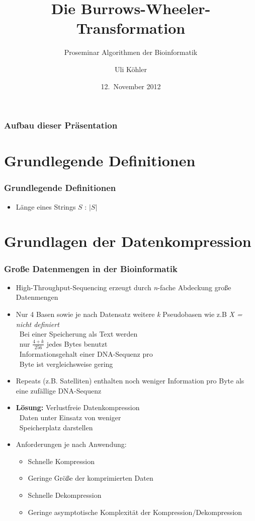 \documentclass[14pt,xcolor=dvipsnames,pdftex]{beamer}
\title{Die Burrows-Wheeler-Transformation}
\subtitle{Proseminar \glqq Algorithmen der Bioinformatik\grqq}
\author{Uli Köhler}
\date{12.~November 2012}
\begin{document}
\frame{\titlepage}
\begin{frame}
\frametitle{Aufbau dieser Präsentation}
\tableofcontents
\end{frame}
\section{Grundlegende Definitionen}
\begin{frame}
 \frametitle{Grundlegende Definitionen}
 \begin{itemize}
  \item Länge eines Strings $S$ : $|S|$
 \end{itemize}

\end{frame}

\section{Grundlagen der Datenkompression}
\begin{frame}[allowframebreaks]
\frametitle{Große Datenmengen in der Bioinformatik}
  \begin{itemize}
   \item High-Throughput-Sequencing erzeugt durch \textit{n}-fache Abdeckung große Datenmengen
   \item Nur 4 Basen  sowie je nach Datensatz weitere \textit{k} Pseudobasen wie z.B \textit{X = nicht definiert}\\
   \textrightarrow\ Bei einer Speicherung als Text werden\\\quad\ nur $\frac{4+k}{256}$ jedes Bytes benutzt\\
   \textrightarrow\ Informationsgehalt einer DNA-Sequenz pro\\\quad\ Byte ist vergleichsweise gering
  \end{itemize}
\framebreak
\begin{itemize}
 \item Repeats (z.B. Satelliten) enthalten noch weniger Information pro Byte als eine zufällige DNA-Sequenz
\end{itemize}
\framebreak
\begin{itemize}
 \item \textbf{Lösung:} Verlustfreie Datenkompression\\
 \textrightarrow\ Daten unter Einsatz von weniger\\
 \quad\ Speicherplatz darstellen
 \item Anforderungen je nach Anwendung:
 \begin{itemize}
  \item Schnelle Kompression
  \item Geringe Größe der komprimierten Daten
  \item Schnelle Dekompression
  \item Geringe asymptotische Komplexität der Kompression/Dekompression
 \end{itemize}
\end{itemize}
\end{frame}
\end{document}
